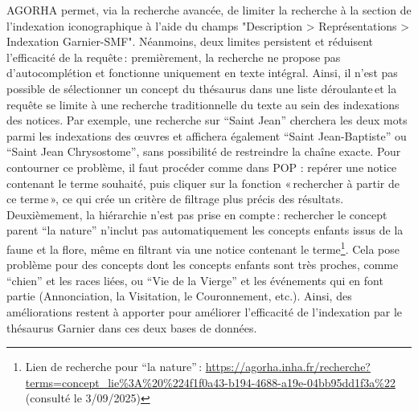 AGORHA permet, via la recherche avancée, de limiter la recherche à la section de l'indexation iconographique à l'aide du champs "Description > Représentations > Indexation Garnier-SMF". Néanmoins, deux limites persistent et réduisent l'efficacité de la requête : premièrement, la recherche ne propose pas d’autocomplétion et fonctionne uniquement en texte intégral. Ainsi, il n’est pas possible de sélectionner un concept du thésaurus dans une liste déroulante et la requête se limite à une recherche traditionnelle du texte au sein des indexations des notices. Par exemple, une recherche sur “Saint Jean” cherchera les deux mots parmi les indexations des œuvres et affichera également “Saint Jean-Baptiste” ou “Saint Jean Chrysostome”, sans possibilité de restreindre la chaîne exacte. Pour contourner ce problème, il faut procéder comme dans POP : repérer une notice contenant le terme souhaité, puis cliquer sur la fonction « rechercher à partir de ce terme », ce qui crée un critère de filtrage plus précis des résultats. Deuxièmement, la hiérarchie n’est pas prise en compte : rechercher le concept parent “la nature” n’inclut pas automatiquement les concepts enfants issus de la faune et la flore, même en filtrant via une notice contenant le terme\footnote{Lien de recherche pour “la nature” : \url{https://agorha.inha.fr/recherche?terms=concept_lie\%3A\%20\%224f1f0a43-b194-4688-a19e-04bb95dd1f3a\%22} (consulté le 3/09/2025)}. Cela pose problème pour des concepts dont les concepts enfants sont très proches, comme “chien” et les races liées, ou “Vie de la Vierge” et les événements qui en font partie (Annonciation, la Visitation, le Couronnement, etc.). Ainsi, des améliorations restent à apporter pour améliorer l’efficacité de l’indexation par le thésaurus Garnier dans ces deux bases de données.

